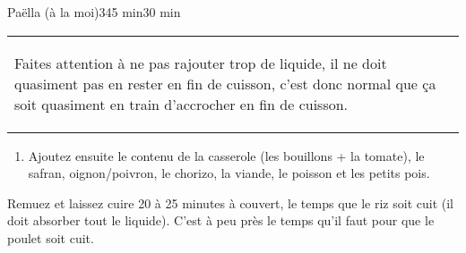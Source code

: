 \begin{recette}{Paëlla (à la moi)}{3}{45 min}{30 min}
\begin{preparation*}
\begin{tabular}{p{}|p{}}
\begin{remarque}
Faites attention à ne pas rajouter trop de liquide, il ne doit quasiment pas en rester en fin de cuisson, c'est donc normal que ça soit quasiment en train d'accrocher en fin de cuisson.
\end{remarque}
\end{tabular}
\begin{enumerate}
\item Ajoutez ensuite le contenu de la casserole (les bouillons + la tomate), le safran, oignon/poivron, le chorizo, la viande, le poisson et les petits pois.
\end{enumerate}
\end{preparation*}

\begin{cuisson}
Remuez et laissez cuire 20 à 25 minutes à couvert, le temps que le riz soit cuit (il doit absorber tout le liquide). C'est à peu près le temps qu'il faut pour que le poulet soit cuit. 
\end{cuisson}


\end{recette}

